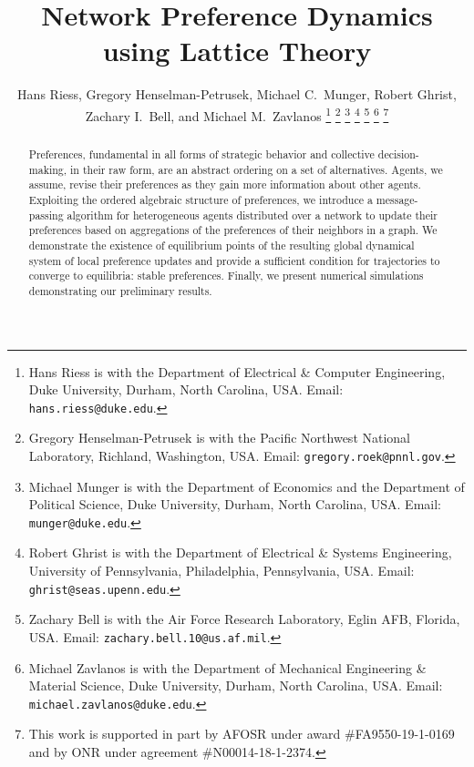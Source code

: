 \documentclass[conference]{ieeeconf}
\begin{document}
\title{\bf Network Preference Dynamics using Lattice Theory}

\author{Hans Riess, Gregory Henselman-Petrusek, Michael C.~Munger, Robert Ghrist, \\ Zachary I.~Bell, and Michael M.~Zavlanos%
\thanks{Hans Riess is with the Department of Electrical \& Computer Engineering, Duke University, Durham, North Carolina, USA. Email: {\tt hans.riess@duke.edu}.}%
\thanks{Gregory Henselman-Petrusek is with the Pacific Northwest National Laboratory, Richland, Washington, USA. Email: {\tt gregory.roek@pnnl.gov}.}%
\thanks{Michael Munger is with the Department of Economics and the Department of Political Science, Duke University, Durham, North Carolina, USA. Email: {\tt munger@duke.edu}.}%
\thanks{Robert Ghrist is with the Department of Electrical \& Systems Engineering, University of Pennsylvania, Philadelphia, Pennsylvania, USA. Email: {\tt ghrist@seas.upenn.edu}.}%
\thanks{Zachary Bell is with the Air Force Research Laboratory, Eglin AFB, Florida, USA. Email: {\tt zachary.bell.10@us.af.mil}.}%
\thanks{Michael Zavlanos is with the Department of Mechanical Engineering \& Material Science, Duke University, Durham, North Carolina, USA. Email: {\tt michael.zavlanos@duke.edu}.}%
\thanks{This work is supported in part by AFOSR under award \#FA9550-19-1-0169 and by ONR under agreement \#N00014-18-1-2374.}%
}
\maketitle

\begin{abstract}
Preferences, fundamental in all forms of strategic behavior and collective decision-making, in their raw form, are an abstract ordering on a set of alternatives. Agents, we assume, revise their preferences as they gain more information about other agents. Exploiting the ordered algebraic structure of preferences,  we introduce a message-passing algorithm for heterogeneous agents distributed over a network to update their preferences based on aggregations of the preferences of their neighbors in a graph. We demonstrate the existence of equilibrium points of the resulting global dynamical system of local preference updates and provide a sufficient condition for trajectories to converge to equilibria: stable preferences. Finally, we present numerical simulations demonstrating our preliminary results. %
\end{abstract}
\end{document}

